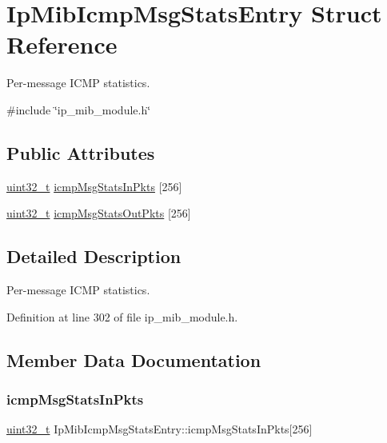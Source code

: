 \hypertarget{structIpMibIcmpMsgStatsEntry}{}\section{Ip\+Mib\+Icmp\+Msg\+Stats\+Entry Struct Reference}
\label{structIpMibIcmpMsgStatsEntry}


Per-\/message I\+C\+MP statistics.  




{\ttfamily \#include \char`\"{}ip\+\_\+mib\+\_\+module.\+h\char`\"{}}

\subsection*{Public Attributes}
\begin{DoxyCompactItemize}
\item 
\hyperlink{stdint_8h_a435d1572bf3f880d55459d9805097f62}{uint32\+\_\+t} \hyperlink{structIpMibIcmpMsgStatsEntry_a7d8422bd5d00e48e9d2b3928e7123228}{icmp\+Msg\+Stats\+In\+Pkts} \mbox{[}256\mbox{]}
\item 
\hyperlink{stdint_8h_a435d1572bf3f880d55459d9805097f62}{uint32\+\_\+t} \hyperlink{structIpMibIcmpMsgStatsEntry_a2c25425bd4fa6a85335e2af2c16d90d5}{icmp\+Msg\+Stats\+Out\+Pkts} \mbox{[}256\mbox{]}
\end{DoxyCompactItemize}


\subsection{Detailed Description}
Per-\/message I\+C\+MP statistics. 

Definition at line 302 of file ip\+\_\+mib\+\_\+module.\+h.



\subsection{Member Data Documentation}
\mbox{\label{structIpMibIcmpMsgStatsEntry_a7d8422bd5d00e48e9d2b3928e7123228}} 
\subsubsection{\texorpdfstring{icmp\+Msg\+Stats\+In\+Pkts}{icmpMsgStatsInPkts}}
{\footnotesize\ttfamily \hyperlink{stdint_8h_a435d1572bf3f880d55459d9805097f62}{uint32\+\_\+t} Ip\+Mib\+Icmp\+Msg\+Stats\+Entry\+::icmp\+Msg\+Stats\+In\+Pkts\mbox{[}256\mbox{]}}



